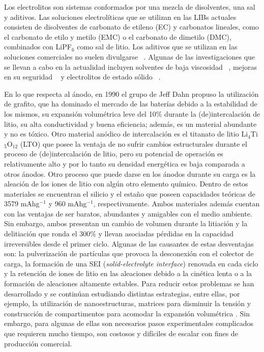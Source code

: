 Los electrolitos son sistemas conformados por una mezcla de disolventes, una 
sal y aditivos. Las soluciones electrolíticas que se utilizan en las LIBs actuales 
consisten de disolventes de carbonato de etileno (EC) y carbonatos lineales, como
el carbonato de etilo y metilo (EMC) o el carbonato de dimetilo (DMC), combinados 
con LiPF$_6$ como sal de litio. Los aditivos que se utilizan en las soluciones 
comerciales no suelen divulgarse ~\cite{schipper2016}. Algunas de las 
investigaciones que se llevan a cabo en la actualidad incluyen solventes de
baja viscosidad ~\cite{logan2020}, mejoras en su seguridad ~\cite{wang2019} 
y electrolitos de estado sólido ~\cite{zheng2018}.

En lo que respecta al ánodo, en 1990 el grupo de Jeff Dahn \cite{fong1990} propuso 
la utilización de grafito, que ha dominado el mercado de las baterías debido a
la estabilidad de los mismos, su expansión volumétrica leve del 10\% durante 
la (de)intercalación de litio, su alta conductividad y buena eficiencia; además, 
es un material abundante y no es tóxico. Otro material anódico de intercalación 
es el titanato de litio Li$_4$Ti$_5$O$_{12}$ (LTO) que posee la ventaja de 
no sufrir cambios estructurales durante el proceso de (de)intercalación de litio, 
pero su potencial de operación es relativamente alto y por lo tanto su densidad energética es baja comparada a otros ánodos. Otro proceso que
puede darse en los ánodos durante su carga es la aleación de los iones de litio 
con algún otro elemento químico. Dentro de estos materiales se encuentran el silicio y el estaño
que poseen capacidades teóricas de 3579 mAhg$^{-1}$ y 960 mAhg$^{-1}$, 
respectivamente. Ambos materiales además cuentan con las ventajas de ser baratos,
abundantes y amigables con el medio ambiente. Sin embargo, ambos presentan un 
cambio de volumen durante la litiación y la delitiación que ronda el 300\% y 
llevan asociadas pérdidas en la capacidad irreversibles desde el primer ciclo.
Algunas de las causantes de estas desventajas son: la pulverización de 
partículas que provoca la desconexión con el colector de carga, la formación de 
una SEI (\textit{solid-electrolyte interface}) renovada en cada ciclo y la 
retención de iones de litio en las aleaciones debido a la cinética lenta o a la
formación de aleaciones altamente estables. Para reducir estos problemas se 
han desarrollado y se continúan estudiando distintas estrategias, entre ellas,
por ejemplo, la utilización de nanoestructuras, matrices para disminuir la 
tensión y construcción de compartimentos para acomodar la expansión 
volumétrica \cite{zuo2016}. Sin embargo, para algunas de ellas son necesarios pasos 
experimentales complicados que requieren mucho tiempo, son costosos y difíciles
de escalar con fines de producción comercial.

